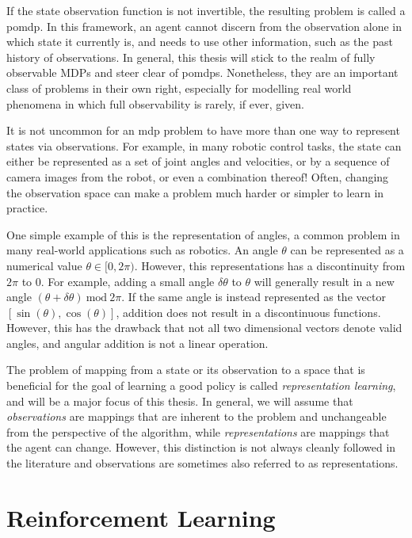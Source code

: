 If the state observation function is not invertible, the resulting problem is called a \ac{pomdp}.
In this framework, an agent cannot discern from the observation alone in which state it currently is, and needs to use other information, such as the past history of observations.
In general, this thesis will stick to the realm of fully observable MDPs and steer clear of \acp{pomdp}.
Nonetheless, they are an important class of problems in their own right, especially for modelling real world phenomena in which full observability is rarely, if ever, given.

It is not uncommon for an \ac{mdp} problem to have more than one way to represent states via observations.
For example, in many robotic control tasks, the state can either be represented as a set of joint angles and velocities, or by a sequence of camera images from the robot, or even a combination thereof!
Often, changing the observation space can make a problem much harder or simpler to learn in practice.

One simple example of this is the representation of angles, a common problem in many real-world applications such as robotics.
An angle $\theta$ can be represented as a numerical value $\theta \in [0,2\pi)$.
However, this representations has a discontinuity from $2\pi$ to $0$.
For example, adding a small angle $\delta\theta$ to $\theta$ will generally result in a new angle $(\theta + \delta\theta)~\mathrm{mod}~2\pi$.
If the same angle is instead represented as the vector $[\sin(\theta),\cos(\theta)]$, addition does not result in a discontinuous functions.
However, this has the drawback that not all two dimensional vectors denote valid angles, and angular addition is not a linear operation.

The problem of mapping from a state or its observation to a space that is beneficial for the goal of learning a good policy is called \emph{representation learning}, and will be a major focus of this thesis.
In general, we will assume that \emph{observations} are mappings that are inherent to the problem and unchangeable from the perspective of the algorithm, while \emph{representations} are mappings that the agent can change.
However, this distinction is not always cleanly followed in the literature and observations are sometimes also referred to as representations.


\section{Reinforcement Learning}
\label{chap:background:rl}


